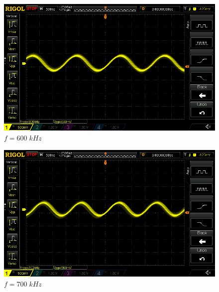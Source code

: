 \documentclass[uplatex,a4paper,11pt,oneside,openany]{jsbook}
\begin{document}
\begin{spacing}{0.67}
  \begin{multicols}{2}
    \begin{figure}[H]
       \centering
        \includegraphics[keepaspectratio, scale=0.28, angle=0]
                    {rigol/figs/FrqCharM1Y1_2kR/600khz.png}
                    \caption{$f=600\;kHz$}
                    \label{fig:frq600k}
    \end{figure}
  
    \begin{figure}[H]
       \centering
        \includegraphics[keepaspectratio, scale=0.28, angle=0]
                  {rigol/figs/FrqCharM1Y1_2kR/700khz.png}
                  \caption{$f=700\;kHz$}
                  \label{fig:frq700k}
    \end{figure}
  \end{multicols}


\end{spacing}
\end{document}

